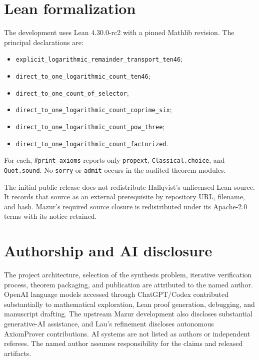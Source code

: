 \documentclass[11pt]{article}
\theoremstyle{definition}
\theoremstyle{remark}
\begin{document}
\section{Lean formalization}
The development uses Lean 4.30.0-rc2 with a pinned Mathlib revision.  The
principal declarations are:
\begin{itemize}[leftmargin=2em]
\item \texttt{explicit\_logarithmic\_remainder\_transport\_ten46};
\item \texttt{direct\_to\_one\_logarithmic\_count\_ten46};
\item \texttt{direct\_to\_one\_count\_of\_selector};
\item \texttt{direct\_to\_one\_logarithmic\_count\_coprime\_six};
\item \texttt{direct\_to\_one\_logarithmic\_count\_pow\_three};
\item \texttt{direct\_to\_one\_logarithmic\_count\_factorized}.
\end{itemize}
For each, \texttt{\#print axioms} reports only \texttt{propext},
\texttt{Classical.choice}, and \texttt{Quot.sound}.  No \texttt{sorry} or
\texttt{admit} occurs in the audited theorem modules.

The initial public release does not redistribute Hallqvist's unlicensed Lean
source.  It records that source as an external prerequisite by repository URL,
filename, and hash.  Mazur's required source closure is redistributed under
its Apache-2.0 terms with its notice retained.

\section*{Authorship and AI disclosure}
The project architecture, selection of the synthesis problem, iterative
verification process, theorem packaging, and publication are attributed to
the named author.  OpenAI language models accessed through ChatGPT/Codex
contributed substantially to mathematical exploration, Lean proof generation,
debugging, and manuscript drafting.  The upstream Mazur development also
discloses substantial generative-AI assistance, and Lau's refinement discloses
autonomous AxiomProver contributions.  AI systems are not listed as authors or
independent referees.  The named author assumes responsibility for the claims
and released artifacts.
\end{document}
